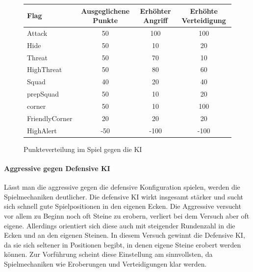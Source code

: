 \begin{figure}
	\begin{tabular}[h]{l|c|c|c}
		Flag & Ausgeglichene Punkte & Erhöhter Angriff & Erhöhte Verteidigung \\
		\hline
		Attack & 50 & 100 & 100\\
		Hide & 50 & 10 & 20\\
		Threat & 50 & 70 & 10\\
		HighThreat & 50 & 80 & 60\\
		Squad & 40 & 20 & 40\\
		prepSquad & 50 & 10 & 20 \\
		corner & 50 & 10 & 100\\
		FriendlyCorner & 20 & 20 & 20\\
		HighAlert & -50 & -100 & -100\\
	\end{tabular}
	\caption{Punkteverteilung im Spiel gegen die KI}
	\label{fig:punkteverteilung}
\end{figure}

\paragraph{Aggressive gegen Defensive KI}
Lässt man die aggressive gegen die defensive Konfiguration spielen, werden die Spielmechaniken deutlicher. Die defensive KI wirkt insgesamt stärker und sucht sich schnell gute Spielpositionen in den eigenen Ecken. Die Aggressive versucht vor allem zu Beginn noch oft Steine zu erobern, verliert bei dem Versuch aber oft eigene. Allerdings orientiert sich diese auch mit steigender Rundenzahl in die Ecken und an den eigenen Steinen. In diesem Versuch gewinnt die Defensive KI, da sie sich seltener in Positionen begibt, in denen eigene Steine erobert werden können. Zur Vorführung scheint diese Einstellung am sinnvollsten, da Spielmechaniken wie Eroberungen und Verteidigungen klar werden. 
